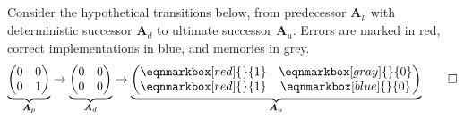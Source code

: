 \documentclass[12pt]{article}
\begin{document}
\begin{exm}
Consider the hypothetical transitions below,
from predecessor $\boldsymbol{A}_{p}$ 
with deterministic successor $\boldsymbol{A}_{d}$
to ultimate successor $\boldsymbol{A}_{u}$.
Errors are marked in red, correct implementations in blue,
and memories in grey.
\begin{equation*}
\underbrace{\begin{pmatrix} 0 & 0 \\ 0 & 1 \\ \end{pmatrix}}_{\boldsymbol{A}_p}
\rightarrow
\underbrace{\begin{pmatrix} 0 & 0 \\ 0 & 0 \\ \end{pmatrix}}_{\boldsymbol{A}_d}
\rightarrow
\underbrace{
    \begin{pmatrix} \eqnmarkbox[red]{}{1} & \eqnmarkbox[gray]{}{0} \\ \eqnmarkbox[red]{}{1} & \eqnmarkbox[blue]{}{0} \\ \end{pmatrix}
}_{\boldsymbol{A}_u}
\qedhere
\end{equation*}

\end{exm}
\end{document}
